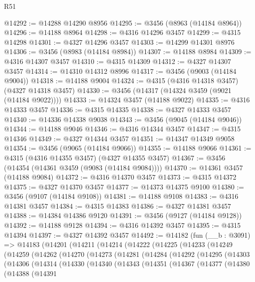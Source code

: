 \begin{lexlean}{R51}
\begin{coremodule}
@14292 := @14288 @14290 @8956
@14295 := @3456 (@8963 (@14184 @8964))
@14296 := @14188 @8964
@14298 := @4316 @14296 @3457
@14299 := @4315 @14298
@14301 := @4327 @14296 @3457
@14303 := @14299 @14301 @8976
@14306 := @3456 (@8983 (@14184 @8984))
@14307 := @14188 @8984
@14309 := @4316 @14307 @3457
@14310 := @4315 @14309
@14312 := @4327 @14307 @3457
@14314 := @14310 @14312 @8996
@14317 := @3456 (@9003 (@14184 @9004))
@14318 := @14188 @9004
@14324 := @4315 (@4316 @14318 @3457) (@4327 @14318 @3457)
@14330 := @3456 (@14317 (@14324 @3459 (@9021 (@14184 @9022))))
@14333 := @14324 @3457 (@14188 @9022)
@14335 := @4316 @14333 @3457
@14336 := @4315 @14335
@14338 := @4327 @14333 @3457
@14340 := @14336 @14338 @9038
@14343 := @3456 (@9045 (@14184 @9046))
@14344 := @14188 @9046
@14346 := @4316 @14344 @3457
@14347 := @4315 @14346
@14349 := @4327 @14344 @3457
@14351 := @14347 @14349 @9058
@14354 := @3456 (@9065 (@14184 @9066))
@14355 := @14188 @9066
@14361 := @4315 (@4316 @14355 @3457) (@4327 @14355 @3457)
@14367 := @3456 (@14354 (@14361 @3459 (@9083 (@14184 @9084))))
@14370 := @14361 @3457 (@14188 @9084)
@14372 := @4316 @14370 @3457
@14373 := @4315 @14372
@14375 := @4327 @14370 @3457
@14377 := @14373 @14375 @9100
@14380 := @3456 (@9107 (@14184 @9108))
@14381 := @14188 @9108
@14383 := @4316 @14381 @3457
@14384 := @4315 @14383
@14386 := @4327 @14381 @3457
@14388 := @14384 @14386 @9120
@14391 := @3456 (@9127 (@14184 @9128))
@14392 := @14188 @9128
@14394 := @4316 @14392 @3457
@14395 := @4315 @14394
@14397 := @4327 @14392 @3457
@14492 := @14182
    (fun (__b : @3091) =>
    @14183
      (@14201
        (@14211
          (@14214
            (@14222
              (@14225
                (@14233
                  (@14249
                    (@14259
                      (@14262
                        (@14270
                          (@14273
                            (@14281
                              (@14284
                                (@14292
                                  (@14295
                                    (@14303
                                      (@14306
                                        (@14314
                                          (@14330
                                            (@14340
                                              (@14343
                                                (@14351
                                                  (@14367
                                                    (@14377
                                                      (@14380
                                                        (@14388
                                                          (@14391

\end{coremodule}
\end{lexlean}
